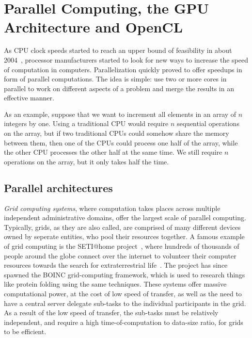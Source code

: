 \section{Parallel Computing, the GPU Architecture and OpenCL}

As CPU clock speeds started to reach an upper bound of feasibility in
about 2004~\cite{clockspeed}, processor manufacturers started to look
for new ways to increase the speed of computation in
computers. Parallelization quickly proved to offer speedups in form of
parallel computations. The idea is simple: use two or more cores in
parallel to work on different aspects of a problem and merge the
results in an effective manner.

As an example, suppose that we want to increment all elements in an
array of $n$ integers by one. Using a traditional CPU would require
$n$ sequential operations on the array, but if two traditional CPUs
could somehow share the memory between them, then one of the CPUs
could process one half of the array, while the other CPU processes the
other half at the same time. We still require $n$ operations on the
array, but it only takes half the time.

\subsection{Parallel architectures}

\emph{Grid computing systems}, where computation takes places across
multiple independent administrative domains, offer the largest scale
of parallel computing. Typically, grids, as they are also called, are
comprised of many different devices owned by seperate entities, who
pool their resources together. A famous example of grid computing is
the SETI@home project~\cite{seti}, where hundreds of thousands of
people around the globe connect over the internet to volunteer their
computer resources towards the search for extraterrestrial
life~\cite{seti-number}. The project has since spawned the BOINC
grid-computing framework, which is used to research things like
protein folding \cite{boinc-other} using the same techniques. These
systems offer massive computational power, at the cost of low speed of
transfer, as well as the need to have a central server delegate
sub-tasks to the individual participants in the grid. As a result of
the low speed of transfer, the sub-tasks must be relatively
independent, and require a high time-of-computation to data-size
ratio, for grids to be efficient.

